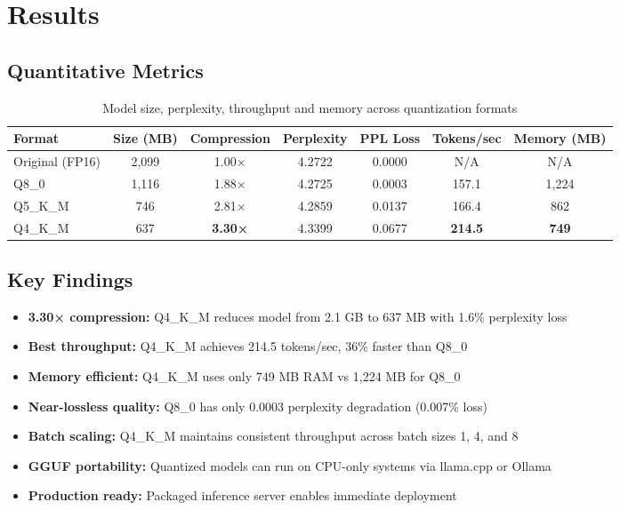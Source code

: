\documentclass[11pt,a4paper]{article}
\begin{document}
\section*{Results}

\subsection*{Quantitative Metrics}
\begin{table}[H]
\centering
\scriptsize
\begin{tabular}{@{}lcccccc@{}}
\toprule
\textbf{Format} & \textbf{Size (MB)} & \textbf{Compression} & \textbf{Perplexity} & \textbf{PPL Loss} & \textbf{Tokens/sec} & \textbf{Memory (MB)} \\
\midrule
Original (FP16) & 2,099 & 1.00× & 4.2722 & 0.0000 & N/A & N/A \\
Q8\_0 & 1,116 & 1.88× & 4.2725 & 0.0003 & 157.1 & 1,224 \\
Q5\_K\_M & 746 & 2.81× & 4.2859 & 0.0137 & 166.4 & 862 \\
Q4\_K\_M & 637 & \textbf{3.30×} & 4.3399 & 0.0677 & \textbf{214.5} & \textbf{749} \\
\bottomrule
\end{tabular}
\caption{Model size, perplexity, throughput and memory across quantization formats}
\end{table}

\subsection*{Key Findings}
\begin{itemize}
    \item \textbf{3.30× compression:} Q4\_K\_M reduces model from 2.1 GB to 637 MB with 1.6\% perplexity loss
    \item \textbf{Best throughput:} Q4\_K\_M achieves 214.5 tokens/sec, 36\% faster than Q8\_0
    \item \textbf{Memory efficient:} Q4\_K\_M uses only 749 MB RAM vs 1,224 MB for Q8\_0
    \item \textbf{Near-lossless quality:} Q8\_0 has only 0.0003 perplexity degradation (0.007\% loss)
    \item \textbf{Batch scaling:} Q4\_K\_M maintains consistent throughput across batch sizes 1, 4, and 8
    \item \textbf{GGUF portability:} Quantized models can run on CPU-only systems via llama.cpp or Ollama
    \item \textbf{Production ready:} Packaged inference server enables immediate deployment
\end{itemize}
\end{document}
